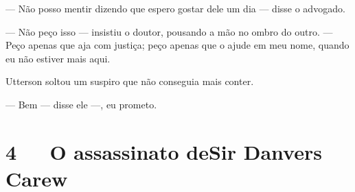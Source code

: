 --- Não posso mentir dizendo que espero gostar dele um dia --- disse o
advogado.

--- Não peço isso --- insistiu o doutor, pousando a mão no ombro do outro.
--- Peço apenas que aja com justiça; peço apenas que o ajude em meu nome,
quando eu não estiver mais aqui.

Utterson soltou um suspiro que não conseguia mais conter.

--- Bem --- disse ele ---, eu prometo.


\chapter[4\ \ \ O assassinato de Sir Danvers Carew]{4\ \ \ O assassinato de\break Sir Danvers Carew}

